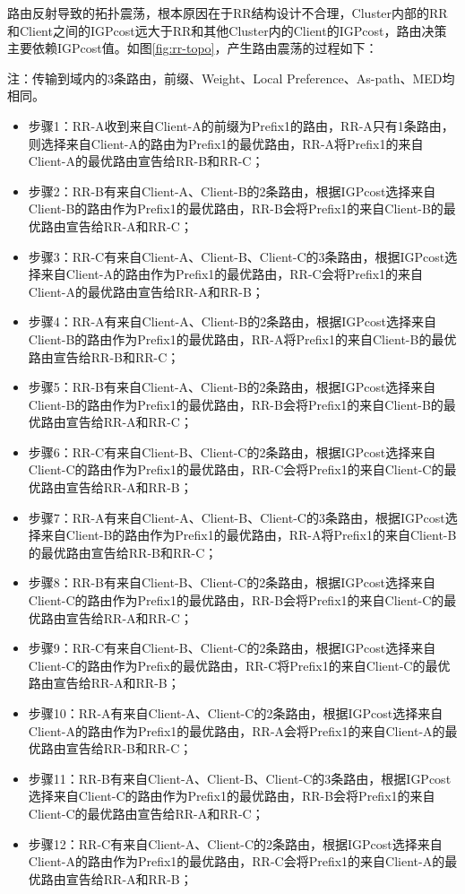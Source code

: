 路由反射导致的拓扑震荡，根本原因在于RR结构设计不合理，Cluster内部的RR和Client之间的IGPcost远大于RR和其他Cluster内的Client的IGPcost，路由决策主要依赖IGPcost值。如图\ref{fig:rr-topo}，产生路由震荡的过程如下：

注：传输到域内的3条路由，前缀、Weight、Local Preference、As-path、MED均相同。

\begin{itemize}
\item 步骤1：RR-A收到来自Client-A的前缀为Prefix1的路由，RR-A只有1条路由，则选择来自Client-A的路由为Prefix1的最优路由，RR-A将Prefix1的来自Client-A的最优路由宣告给RR-B和RR-C；
\item 步骤2：RR-B有来自Client-A、Client-B的2条路由，根据IGPcost选择来自Client-B的路由作为Prefix1的最优路由，RR-B会将Prefix1的来自Client-B的最优路由宣告给RR-A和RR-C；
\item 步骤3：RR-C有来自Client-A、Client-B、Client-C的3条路由，根据IGPcost选择来自Client-A的路由作为Prefix1的最优路由，RR-C会将Prefix1的来自Client-A的最优路由宣告给RR-A和RR-B；


\item 步骤4：RR-A有来自Client-A、Client-B的2条路由，根据IGPcost选择来自Client-B的路由作为Prefix1的最优路由，RR-A将Prefix1的来自Client-B的最优路由宣告给RR-B和RR-C；
\item 步骤5：RR-B有来自Client-A、Client-B的2条路由，根据IGPcost选择来自Client-B的路由作为Prefix1的最优路由，RR-B会将Prefix1的来自Client-B的最优路由宣告给RR-A和RR-C；
\item 步骤6：RR-C有来自Client-B、Client-C的2条路由，根据IGPcost选择来自Client-C的路由作为Prefix1的最优路由，RR-C会将Prefix1的来自Client-C的最优路由宣告给RR-A和RR-B；


\item 步骤7：RR-A有来自Client-A、Client-B、Client-C的3条路由，根据IGPcost选择来自Client-B的路由作为Prefix1的最优路由，RR-A将Prefix1的来自Client-B的最优路由宣告给RR-B和RR-C；
\item 步骤8：RR-B有来自Client-B、Client-C的2条路由，根据IGPcost选择来自Client-C的路由作为Prefix1的最优路由，RR-B会将Prefix1的来自Client-C的最优路由宣告给RR-A和RR-C；
\item 步骤9：RR-C有来自Client-B、Client-C的2条路由，根据IGPcost选择来自Client-C的路由作为Prefix的最优路由，RR-C将Prefix1的来自Client-C的最优路由宣告给RR-A和RR-B；


\item 步骤10：RR-A有来自Client-A、Client-C的2条路由，根据IGPcost选择来自Client-A的路由作为Prefix1的最优路由，RR-A会将Prefix1的来自Client-A的最优路由宣告给RR-B和RR-C；
\item 步骤11：RR-B有来自Client-A、Client-B、Client-C的3条路由，根据IGPcost选择来自Client-C的路由作为Prefix1的最优路由，RR-B会将Prefix1的来自Client-C的最优路由宣告给RR-A和RR-C；
\item 步骤12：RR-C有来自Client-A、Client-C的2条路由，根据IGPcost选择来自Client-A的路由作为Prefix1的最优路由，RR-C会将Prefix1的来自Client-A的最优路由宣告给RR-A和RR-B；



\end{itemize}

